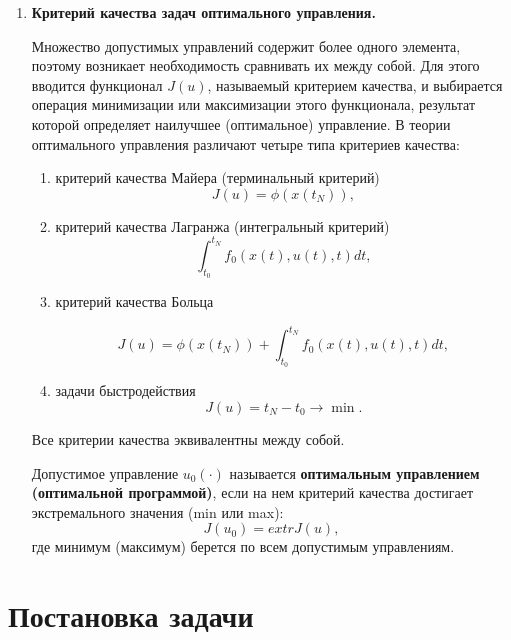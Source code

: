 \begin{enumerate}
    
    \item \textbf{Критерий качества задач оптимального управления.}

 Множество допустимых управлений  содержит более одного элемента, поэтому возникает необходимость сравнивать их между собой. Для этого вводится функционал $J(u)$, называемый критерием качества, и выбирается операция минимизации или максимизации этого функционала, результат которой определяет наилучшее (оптимальное) управление. В теории оптимального управления различают четыре типа критериев качества:
\begin{enumerate}
    \item критерий качества Майера (терминальный критерий)
    \begin{equation} \label{eq_op:Mayers} J(u) = \phi(x(t_N)),
    \end{equation}
    \item критерий качества Лагранжа (интегральный критерий)
    \begin{equation} \label{eq_op:Lagranzh} \int_{t_0}^{t_N}f_0(x(t),u(t),t)dt,
    \end{equation}
    \item критерий качества Больца
    
    \begin{equation} \label{eq_op:Bolc} J(u) = \phi(x(t_N)) + \int_{t_0}^{t_N}f_0(x(t),u(t),t)dt,
    \end{equation}
    \item задачи быстродействия
    \begin{equation} \label{eq_op:Bystr}J(u)=t_N - t_0 \rightarrow \min.
    \end{equation}
\end{enumerate}
Все критерии качества эквивалентны между собой.

Допустимое управление $u_0 (·)$ называется \textbf{оптимальным управлением (оптимальной программой)}, если на нем критерий качества достигает экстремального значения (min или max): $$J(u_0) = extr J(u),$$
где минимум (максимум) берется по всем допустимым управлениям.

\end{enumerate}



\section{Постановка задачи}\label{1sec:task}

